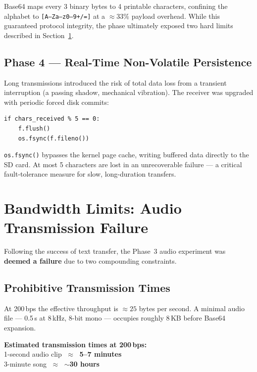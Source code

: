 \documentclass[10pt, twocolumn, a4paper]{article}
\begin{document}
Base64 maps every 3 binary bytes to 4 printable characters, confining the alphabet to \texttt{[A–Za–z0–9+/=]} at a $\approx33\%$ payload overhead. While this guaranteed protocol integrity, the phase ultimately exposed two hard limits described in Section~\ref{sec:limits}.

\subsection{Phase 4 — Real-Time Non-Volatile Persistence}

Long transmissions introduced the risk of total data loss from a transient interruption (a passing shadow, mechanical vibration). The receiver was upgraded with periodic forced disk commits:

\begin{lstlisting}[caption={Forced kernel bypass to physical storage}, label=lst:fsync]
if chars_received % 5 == 0:
    f.flush()
    os.fsync(f.fileno())
\end{lstlisting}

\texttt{os.fsync()} bypasses the kernel page cache, writing buffered data directly to the SD card. At most 5 characters are lost in an unrecoverable failure — a critical fault-tolerance measure for slow, long-duration transfers.

\section{Bandwidth Limits: Audio Transmission Failure}
\label{sec:limits}

Following the success of text transfer, the Phase~3 audio experiment was \textbf{deemed a failure} due to two compounding constraints.

\subsection{Prohibitive Transmission Times}

At 200\,bps the effective throughput is $\approx25$ bytes per second. A minimal audio file — 0.5\,s at 8\,kHz, 8-bit mono — occupies roughly 8\,KB before Base64 expansion.

\begin{warnbox}
\textbf{Estimated transmission times at 200\,bps:}\\[4pt]
\hspace*{4pt}1-second audio clip $\;\approx\;$ \textbf{5–7 minutes}\\
\hspace*{4pt}3-minute song $\;\approx\;$ \textbf{$\sim$30 hours}
\end{warnbox}
\end{document}
